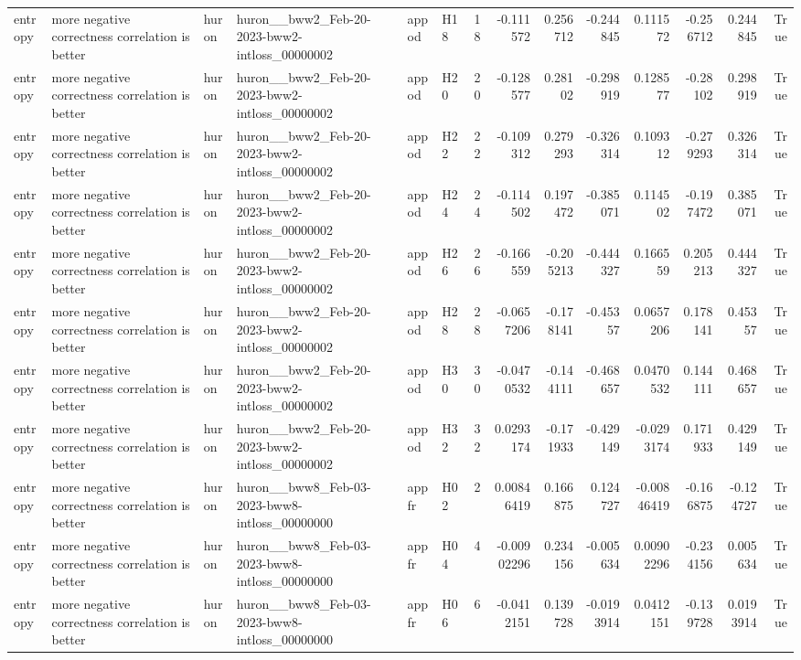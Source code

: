 \begin{longtable}{llllllrrrrrrrr}
entropy & more negative correctness correlation is better & huron & huron\_\_bww2\_Feb-20-2023-bww2-intloss\_00000002 & appod & H18 & 18 & -0.111572 & 0.256712 & -0.244845 & 0.111572 & -0.256712 & 0.244845 & True \\
entropy & more negative correctness correlation is better & huron & huron\_\_bww2\_Feb-20-2023-bww2-intloss\_00000002 & appod & H20 & 20 & -0.128577 & 0.28102 & -0.298919 & 0.128577 & -0.28102 & 0.298919 & True \\
entropy & more negative correctness correlation is better & huron & huron\_\_bww2\_Feb-20-2023-bww2-intloss\_00000002 & appod & H22 & 22 & -0.109312 & 0.279293 & -0.326314 & 0.109312 & -0.279293 & 0.326314 & True \\
entropy & more negative correctness correlation is better & huron & huron\_\_bww2\_Feb-20-2023-bww2-intloss\_00000002 & appod & H24 & 24 & -0.114502 & 0.197472 & -0.385071 & 0.114502 & -0.197472 & 0.385071 & True \\
entropy & more negative correctness correlation is better & huron & huron\_\_bww2\_Feb-20-2023-bww2-intloss\_00000002 & appod & H26 & 26 & -0.166559 & -0.205213 & -0.444327 & 0.166559 & 0.205213 & 0.444327 & True \\
entropy & more negative correctness correlation is better & huron & huron\_\_bww2\_Feb-20-2023-bww2-intloss\_00000002 & appod & H28 & 28 & -0.0657206 & -0.178141 & -0.45357 & 0.0657206 & 0.178141 & 0.45357 & True \\
entropy & more negative correctness correlation is better & huron & huron\_\_bww2\_Feb-20-2023-bww2-intloss\_00000002 & appod & H30 & 30 & -0.0470532 & -0.144111 & -0.468657 & 0.0470532 & 0.144111 & 0.468657 & True \\
entropy & more negative correctness correlation is better & huron & huron\_\_bww2\_Feb-20-2023-bww2-intloss\_00000002 & appod & H32 & 32 & 0.0293174 & -0.171933 & -0.429149 & -0.0293174 & 0.171933 & 0.429149 & True \\
entropy & more negative correctness correlation is better & huron & huron\_\_bww8\_Feb-03-2023-bww8-intloss\_00000000 & appfr & H02 & 2 & 0.00846419 & 0.166875 & 0.124727 & -0.00846419 & -0.166875 & -0.124727 & True \\
entropy & more negative correctness correlation is better & huron & huron\_\_bww8\_Feb-03-2023-bww8-intloss\_00000000 & appfr & H04 & 4 & -0.00902296 & 0.234156 & -0.005634 & 0.00902296 & -0.234156 & 0.005634 & True \\
entropy & more negative correctness correlation is better & huron & huron\_\_bww8\_Feb-03-2023-bww8-intloss\_00000000 & appfr & H06 & 6 & -0.0412151 & 0.139728 & -0.0193914 & 0.0412151 & -0.139728 & 0.0193914 & True \\

\end{longtable}
